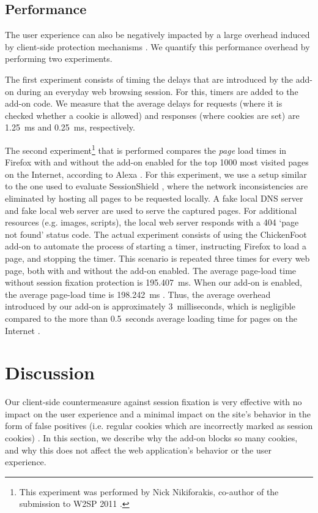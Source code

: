 \subsection{Performance}\label{performance}

The user experience can also be negatively impacted by a large overhead induced by client-side protection mechanisms \cite{Bonne2011}. We quantify this performance overhead by performing two experiments.

The first experiment consists of timing the delays that are introduced by the add-on during an everyday web browsing session. For this, timers are added to the add-on code. We measure that the average delays for requests (where it is checked whether a cookie is allowed) and responses (where cookies are set) are 1.25\ ms and 0.25\ ms, respectively.

The second experiment\footnote{This experiment was performed by Nick Nikiforakis, co-author of the submission to W2SP 2011 \cite{Bonne2011}.} that is performed compares the \emph{page} load times in Firefox with and without the add-on enabled for the top 1000 most visited pages on the Internet, according to Alexa \cite{Alexa1000}. For this experiment, we use a setup similar to the one used to evaluate SessionShield \cite{Nikiforakis2010}, where the network inconsistencies are eliminated by hosting all pages to be requested locally. A fake local DNS server and fake local web server are used to serve the captured pages. For additional resources (e.g. images, scripts), the local web server responds with a 404 `page not found' status code. The actual experiment consists of using the ChickenFoot add-on \cite{ChickenFoot} to automate the process of starting a timer, instructing Firefox to load a page, and stopping the timer. This scenario is repeated three times for every web page, both with and without the add-on enabled. The average page-load time without session fixation protection is 195.407\ ms. When our add-on is enabled, the average page-load time is 198.242\ ms \cite{Bonne2011}. Thus, the average overhead introduced by our add-on is approximately 3\ milliseconds, which is negligible compared to the more than 0.5\ seconds average loading time for pages on the Internet \cite{Webmetrics}.

\section{Discussion}\label{discussion}

Our client-side countermeasure against session fixation is very effective with no impact on the user experience and a minimal impact on the site's behavior in the form of false positives (i.e. regular cookies which are incorrectly marked as session cookies) \cite{Bonne2011}. In this section, we describe why the add-on blocks so many cookies, and why this does not affect the web application's behavior or the user experience.

